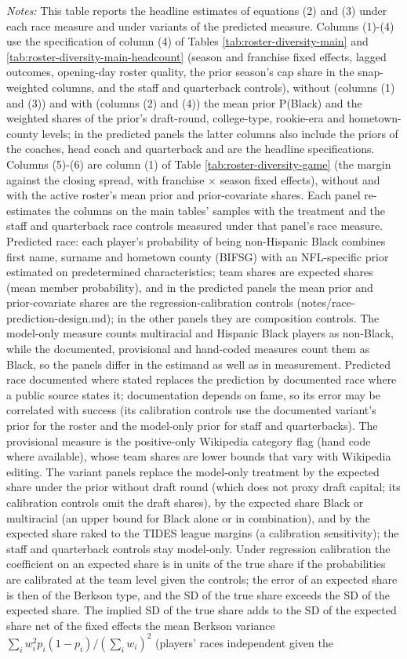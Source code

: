 {\footnotesize
\noindent\textit{Notes:} This table reports the headline estimates of equations (2) and (3) under each race measure and under variants of the predicted measure. Columns (1)-(4) use the specification of column (4) of Tables \ref{tab:roster-diversity-main} and \ref{tab:roster-diversity-main-headcount} (season and franchise fixed effects, lagged outcomes, opening-day roster quality, the prior season's cap share in the snap-weighted columns, and the staff and quarterback controls), without (columns (1) and (3)) and with (columns (2) and (4)) the mean prior P(Black) and the weighted shares of the prior's draft-round, college-type, rookie-era and hometown-county levels; in the predicted panels the latter columns also include the priors of the coaches, head coach and quarterback and are the headline specifications. Columns (5)-(6) are column (1) of Table \ref{tab:roster-diversity-game} (the margin against the closing spread, with franchise $\times$ season fixed effects), without and with the active roster's mean prior and prior-covariate shares. Each panel re-estimates the columns on the main tables' samples with the treatment and the staff and quarterback race controls measured under that panel's race measure. Predicted race: each player's probability of being non-Hispanic Black combines first name, surname and hometown county (BIFSG) with an NFL-specific prior estimated on predetermined characteristics; team shares are expected shares (mean member probability), and in the predicted panels the mean prior and prior-covariate shares are the regression-calibration controls (notes/race-prediction-design.md); in the other panels they are composition controls. The model-only measure counts multiracial and Hispanic Black players as non-Black, while the documented, provisional and hand-coded measures count them as Black, so the panels differ in the estimand as well as in measurement. Predicted race documented where stated replaces the prediction by documented race where a public source states it; documentation depends on fame, so its error may be correlated with success (its calibration controls use the documented variant's prior for the roster and the model-only prior for staff and quarterbacks). The provisional measure is the positive-only Wikipedia category flag (hand code where available), whose team shares are lower bounds that vary with Wikipedia editing.  The variant panels replace the model-only treatment by the expected share under the prior without draft round (which does not proxy draft capital; its calibration controls omit the draft shares), by the expected share Black or multiracial (an upper bound for Black alone or in combination), and by the expected share raked to the TIDES league margins (a calibration sensitivity); the staff and quarterback controls stay model-only. Under regression calibration the coefficient on an expected share is in units of the true share if the probabilities are calibrated at the team level given the controls; the error of an expected share is then of the Berkson type, and the SD of the true share exceeds the SD of the expected share. The implied SD of the true share adds to the SD of the expected share net of the fixed effects the mean Berkson variance $\sum_i w_i^2 p_i(1-p_i)/(\sum_i w_i)^2$ (players' races independent given the }
